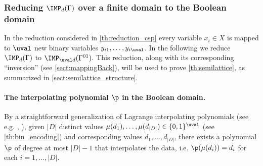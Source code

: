 \documentclass[11pt]{article}
\begin{document}
\subsubsection[Reducing IMPd(Gamma) over a finite domain to the Boolean domain]{Reducing $\IMP_{d}(\Gamma)$ over a finite domain to the Boolean domain} \label{sect:2Bool}
%
In the reduction considered in \cref{th:reduction_csp}  every variable $x_i\in X$ is mapped to $\uval$ new binary variables $y_{i1},\ldots, y_{i\uval}$.
%
In the following we reduce $\IMP_{d}(\Gamma)$ to $\IMP_{\uval d}(\Gamma^{01})$. This reduction, along with its corresponding ``inversion'' (see \cref{sect:mappingBack}), will be used to prove \cref{th:semilattice}, as summarized in \cref{sect:semilattice_structure}.

\paragraph{The interpolating polynomial $\p$ in the Boolean domain.} 
By a straightforward generalization of Lagrange interpolating polynomials (see e.g. \cite{phillips2003interpolation}, \cite{Gasca2000-hx}), given $|D|$ distinct values  $\mu(d_1),\ldots,\mu(d_{|D|})\in \{0,1\}^{\uval}$ (see \cref{th:bin_encoding}) and corresponding values $d_1,\ldots, d_{|D|}$, there exists a polynomial $\p$ of degree at most $|D|-1$ that interpolates the data, i.e. $\p(\mu(d_i))=d_i$ for each $i=1,\ldots,|D|$.
\end{document}
